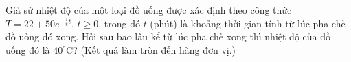 \begin{ex}
Giả sử nhiệt độ của một loại đồ uống được xác định theo công thức $T=22+50e^{-\frac18t}$, $t\ge0$, trong đó $t$ (phút) là khoảng thời gian tính từ lúc pha chế đồ uống đó xong. Hỏi sau bao lâu kể từ lúc pha chế xong thì nhiệt độ của đồ uống đó là $40^\circ\mathrm C$? (Kết quả làm tròn đến hàng đơn vị.)
\end{ex}
